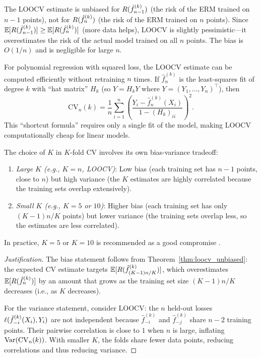 \documentclass[11pt,a4paper]{article}
\begin{document}
\begin{remark}
\label{rem:loocv_bias}
The LOOCV estimate is unbiased for $R(\hat{f}_{n-1}^{(k)})$
(the risk of the ERM trained on $n - 1$ points), not for
$R(\hat{f}_n^{(k)})$ (the risk of the ERM trained on $n$ points).
Since $\mathbb{E}[R(\hat{f}_{n-1}^{(k)})] \geq
\mathbb{E}[R(\hat{f}_n^{(k)})]$ (more data helps), LOOCV is slightly
pessimistic---it overestimates the risk of the actual model trained
on all $n$ points.  The bias is $O(1/n)$ and is negligible for
large $n$.
\end{remark}

\begin{example}
\label{ex:loocv_poly}
For polynomial regression with squared loss, the LOOCV estimate can
be computed efficiently without retraining $n$ times.  If
$\hat{f}_n^{(k)}$ is the least-squares fit of degree $k$ with
``hat matrix'' $H_k$ (so $\hat{Y} = H_k Y$ where
$Y = (Y_1, \ldots, Y_n)^\top$), then
\[
    \mathrm{CV}_n(k) = \frac{1}{n}\sum_{i=1}^n
    \left(\frac{Y_i - \hat{f}_n^{(k)}(X_i)}{1 - (H_k)_{ii}}\right)^2.
\]
This ``shortcut formula'' requires only a single fit of the model,
making LOOCV computationally cheap for linear models.
\end{example}

\begin{proposition}
\label{prop:kfold_bv}
The choice of $K$ in $K$-fold CV involves its own bias-variance
tradeoff:
\begin{enumerate}[nosep,label=(\roman*)]
    \item \emph{Large $K$ (e.g., $K = n$, LOOCV)}: Low bias (each
    training set has $n - 1$ points, close to $n$) but high variance
    (the $K$ estimates are highly correlated because the training
    sets overlap extensively).
    \item \emph{Small $K$ (e.g., $K = 5$ or $10$)}: Higher bias
    (each training set has only $(K-1)n/K$ points) but lower variance
    (the training sets overlap less, so the estimates are less
    correlated).
\end{enumerate}
In practice, $K = 5$ or $K = 10$ is recommended as a good compromise
\citep{arlot2010}.
\end{proposition}

\begin{proof}[Justification]
The bias statement follows from
Theorem~\ref{thm:loocv_unbiased}: the expected CV estimate targets
$\mathbb{E}[R(\hat{f}_{(K-1)n/K}^{(k)})]$, which overestimates
$\mathbb{E}[R(\hat{f}_n^{(k)})]$ by an amount that grows as the
training set size $(K-1)n/K$ decreases (i.e., as $K$ decreases).

For the variance statement, consider LOOCV: the $n$ held-out
losses $\ell(\hat{f}_{-i}^{(k)}(X_i), Y_i)$ are not independent
because $\hat{f}_{-i}^{(k)}$ and $\hat{f}_{-j}^{(k)}$ share
$n - 2$ training points.  Their pairwise correlation is close to
$1$ when $n$ is large, inflating $\operatorname{Var}(\mathrm{CV}_n(k))$.  With
smaller $K$, the folds share fewer data points, reducing
correlations and thus reducing variance.
\end{proof}
\end{document}
